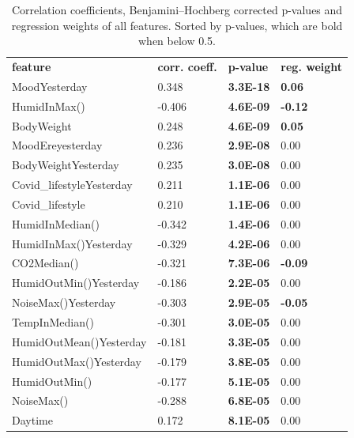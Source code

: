 \documentclass[conference]{IEEEtran}
\begin{document}
\begin{table}[]
\caption[]{Correlation coefficients, Benjamini–Hochberg corrected p-values and regression weights of all features. Sorted by p-values, which are bold when below 0.5.}
\label{tab:features}

\begin{tabular}{llll}
\textbf{feature} & \textbf{corr. coeff.} & \textbf{p-value} & \textbf{reg. weight} \\
MoodYesterday                  & 0.348  & \textbf{3.3E-18} & \textbf{0.06}  \\
HumidInMax()                   & -0.406 & \textbf{4.6E-09} & \textbf{-0.12} \\
BodyWeight                     & 0.248  & \textbf{4.6E-09} & \textbf{0.05}  \\
MoodEreyesterday               & 0.236  & \textbf{2.9E-08} & 0.00           \\
BodyWeightYesterday            & 0.235  & \textbf{3.0E-08} & 0.00           \\
Covid\_lifestyleYesterday      & 0.211  & \textbf{1.1E-06} & 0.00           \\
Covid\_lifestyle               & 0.210  & \textbf{1.1E-06} & 0.00           \\
HumidInMedian()                & -0.342 & \textbf{1.4E-06} & 0.00           \\
HumidInMax()Yesterday          & -0.329 & \textbf{4.2E-06} & 0.00           \\
CO2Median()                    & -0.321 & \textbf{7.3E-06} & \textbf{-0.09} \\
HumidOutMin()Yesterday         & -0.186 & \textbf{2.2E-05} & 0.00           \\
NoiseMax()Yesterday            & -0.303 & \textbf{2.9E-05} & \textbf{-0.05} \\
TempInMedian()                 & -0.301 & \textbf{3.0E-05} & 0.00           \\
HumidOutMean()Yesterday        & -0.181 & \textbf{3.3E-05} & 0.00           \\
HumidOutMax()Yesterday         & -0.179 & \textbf{3.8E-05} & 0.00           \\
HumidOutMin()                  & -0.177 & \textbf{5.1E-05} & 0.00           \\
NoiseMax()                     & -0.288 & \textbf{6.8E-05} & 0.00           \\
Daytime                        & 0.172  & \textbf{8.1E-05} & 0.00           \\

\end{tabular}
\end{table}
\end{document}
